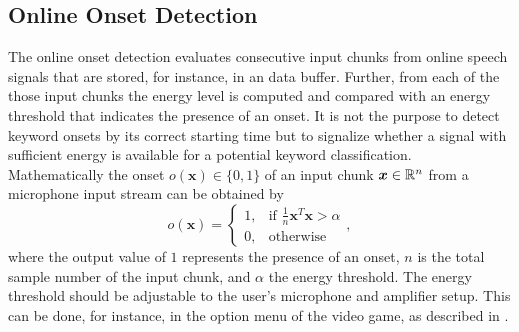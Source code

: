 
\subsection{Online Onset Detection}\label{sec:signal_onset_online}
The online onset detection evaluates consecutive input chunks from online speech signals that are stored, for instance, in an data buffer.
Further, from each of the those input chunks the energy level is computed and compared with an energy threshold that indicates the presence of an onset.
It is not the purpose to detect keyword onsets by its correct starting time but to signalize whether a signal with sufficient energy is available for a potential keyword classification.
Mathematically the onset $o(\bm{x}) \in \{0, 1\}$ of an input chunk $\bm{x} \in \mathbb{R}^n$ from a microphone input stream can be obtained by
\begin{equation}
  o(\bm{x}) = 
  \begin{cases}
    1, & \text{if } \frac{1}{n} \bm{x}^T \bm{x} > \alpha\\
    0, & \text{otherwise} 
  \end{cases},
\end{equation}
where the output value of $1$ represents the presence of an onset, $n$ is the total sample number of the input chunk, and $\alpha$ the energy threshold.
The energy threshold should be adjustable to the user's microphone and amplifier setup. 
This can be done, for instance, in the option menu of the video game, as described in .